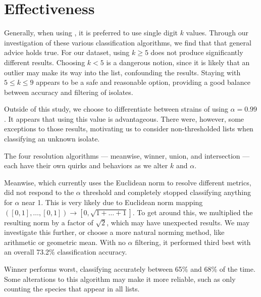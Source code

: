 \section{\krap{} Effectiveness}
Generally, when using \kNN{}, it is preferred to use single digit $k$ values. Through our investigation of these various \kNN{} classification algorithms, we find that that general advice holds true. For our dataset, using $k\geq5$ does not produce significantly different results. Choosing $k<5$ is a dangerous notion, since it is likely that an outlier may make its way into the \knnlong{} list, confounding the results. Staying with $5\leq k\leq9$ appears to be a safe and reasonable option, providing a good balance between accuracy and filtering of isolates.

Outside of this study, we choose to differentiate between strains of \ecoli{} using $\alpha=0.99$. It appears that using this value is advantageous. There were, however, some exceptions to those results, motivating us to consider non-thresholded \knnlong{} lists when classifying an unknown isolate.

The four resolution algorithms --- meanwise, winner, union, and intersection --- each have their own quirks and behaviors as we alter $k$ and $\alpha$. 

Meanwise, which currently uses the Euclidean norm to resolve different metrics, did not respond to the $\alpha$ threshold and completely stopped classifying anything for $\alpha$ near 1. This is very likely due to Euclidean norm mapping $([0,1],\dots,[0,1])\rightarrow [0,\sqrt{1+\dots+1}]$. To get around this, we multiplied the resulting norm by a factor of $\sqrt2$, which may have unexpected results. We may investigate this further, or choose a more natural norming method, like arithmetic or geometric mean. With no $\alpha$ filtering, it performed third best with an overall 73.2\% classification accuracy.

Winner performs worst, classifying accurately between 65\% and 68\% of the time. Some alterations to this algorithm may make it more reliable, such as only counting the species that appear in all lists.

